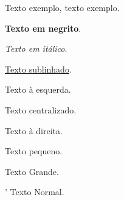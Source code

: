 \documentclass[12pt]{article}
\begin{document}
	
	Texto exemplo, texto exemplo.

	\textbf{Texto em negrito}.

	\textit{Texto em itálico}.

	\underline{Texto sublinhado}.

	\begin{flushleft}
		Texto à esquerda.
	\end{flushleft}

	\begin{center}
		Texto centralizado.
	\end{center}

	\begin{flushright}
		Texto à direita.
	\end{flushright}

	{\tiny Texto pequeno}.

	{\Huge Texto Grande}.

'	Texto Normal.
	
	
	


	
\end{document}
